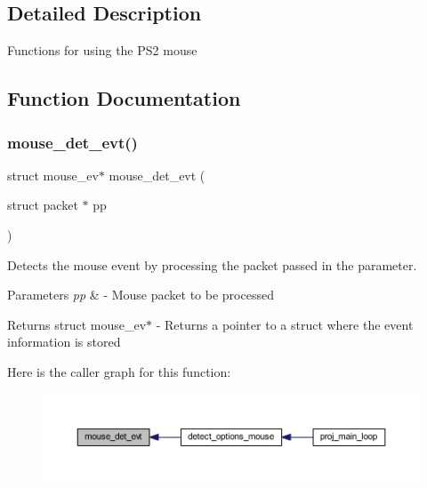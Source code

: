 \subsection{Detailed Description}
Functions for using the P\+S2 mouse 

\subsection{Function Documentation}
\mbox{\label{group__mouse_ga992f9c38f09f0aa71b62cba658094dbe}} 
\subsubsection{\texorpdfstring{mouse\+\_\+det\+\_\+evt()}{mouse\_det\_evt()}}
{\footnotesize\ttfamily struct mouse\+\_\+ev$\ast$ mouse\+\_\+det\+\_\+evt (\begin{DoxyParamCaption}\item[{struct packet $\ast$}]{pp }\end{DoxyParamCaption})}



Detects the mouse event by processing the packet passed in the parameter. 


\begin{DoxyParams}{Parameters}
{\em pp} & -\/ Mouse packet to be processed \\
\hline
\end{DoxyParams}
\begin{DoxyReturn}{Returns}
struct mouse\+\_\+ev$\ast$ -\/ Returns a pointer to a struct where the event information is stored 
\end{DoxyReturn}
Here is the caller graph for this function\+:
\nopagebreak
\begin{figure}[H]
\begin{center}
\leavevmode
\includegraphics[width=350pt]{group__mouse_ga992f9c38f09f0aa71b62cba658094dbe_icgraph}
\end{center}
\end{figure}
\mbox{\label{group__mouse_ga834b6d7efe311484d6da234db333cb97}} 
